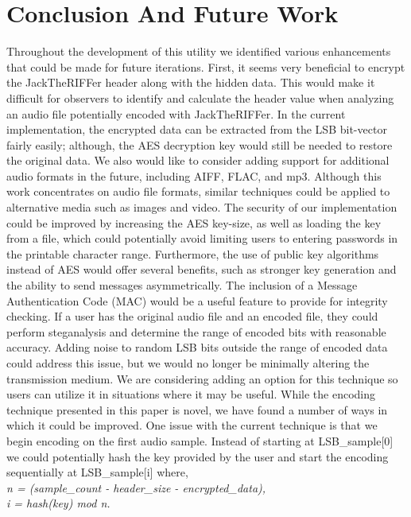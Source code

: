 \section{Conclusion And Future Work}
Throughout the development of this utility we identified various enhancements that could be made for future iterations. First, it seems very beneficial to encrypt the JackTheRIFFer header along with the hidden data. This would make it difficult for observers to identify and calculate the header value when analyzing an audio file potentially encoded with JackTheRIFFer. In the current implementation, the encrypted data can be extracted from the LSB bit-vector fairly easily; although, the AES decryption key would still be needed to restore the original data. We also would like to consider adding support for additional audio formats in the future, including AIFF, FLAC, and mp3. Although this work concentrates on audio file formats, similar techniques could be applied to alternative media such as images and video. The security of our implementation could be improved by increasing the AES key-size, as well as loading the key from a file, which could potentially avoid limiting users to entering passwords in the printable character range. Furthermore, the use of public key algorithms instead of AES would offer several benefits, such as stronger key generation and the ability to send messages asymmetrically. The inclusion of a Message Authentication Code (MAC) would be a useful feature to provide for integrity checking. If a user has the original audio file and an encoded file, they could perform steganalysis and determine the range of encoded bits with reasonable accuracy. Adding noise to random LSB bits outside the range of encoded data could address this issue, but we would no longer be minimally altering the transmission medium. We are considering adding an option for this technique so users can utilize it in situations where it may be useful. While the encoding technique presented in this paper is novel, we have found a number of ways in which it could be improved. One issue with the current technique is that we begin encoding on the first audio sample. Instead of starting at LSB\_sample[0] we could potentially hash the key provided by the user and start the encoding sequentially at LSB\_sample[i] where,\\
\textit{n = (sample\_count - header\_size - encrypted\_data), \\
i = hash(key) mod n.}


